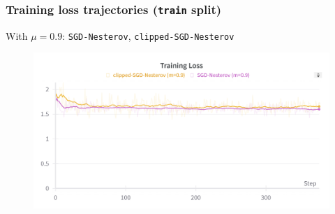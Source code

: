 \begin{frame}
    \frametitle{Training loss trajectories (\texttt{train} split)}
    With \(\mu=0.9\): \texttt{SGD-Nesterov}, \texttt{clipped-SGD-Nesterov}
    \begin{figure}[htpb]
        \begin{center}
            \includegraphics[width=\linewidth]
                {pics/experiments/train_loss_sgdnm}
        \end{center}
    \end{figure}
\end{frame}
